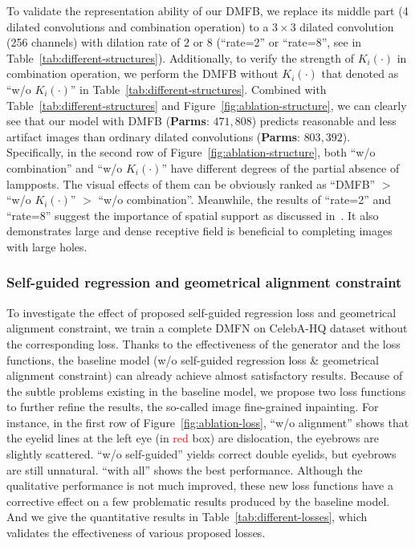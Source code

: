 \documentclass[journal]{IEEEtran}
\begin{document}
To validate the representation ability of our DMFB, we replace its middle part (4 dilated convolutions and combination operation) to a $3 \times 3$ dilated convolution (256 channels) with dilation rate of $2$ or $8$ (``rate=2'' or ``rate=8'', see in Table~\ref{tab:different-structures}). Additionally, to verify the strength of ${K_i}\left(  \cdot  \right)$ in combination operation, we perform the DMFB without ${K_i}\left(  \cdot  \right)$ that denoted as ``w/o ${K_i}\left(  \cdot  \right)$'' in Table~\ref{tab:different-structures}. Combined with Table~\ref{tab:different-structures} and Figure~\ref{fig:ablation-structure}, we can clearly see that our model with DMFB (\textbf{Parms}: $471,808$) predicts reasonable and less artifact images than ordinary dilated convolutions (\textbf{Parms}: $803,392$). Specifically, in the second row of Figure~\ref{fig:ablation-structure}, both ``w/o combination'' and ``w/o ${K_i}\left(  \cdot  \right)$'' have different degrees of the partial absence of lampposts. The visual effects of them can be obviously ranked as ``DMFB'' $>$ ``w/o ${K_i}\left(  \cdot  \right)$'' $>$ ``w/o combination''. Meanwhile, the results of ``rate=2'' and ``rate=8'' suggest the importance of spatial support as discussed in~\cite{globally-and-locally}. It also demonstrates large and dense receptive field is beneficial to completing images with large holes.

\subsubsection{Self-guided regression and geometrical alignment constraint}
To investigate the effect of proposed self-guided regression loss and geometrical alignment constraint, we train a complete DMFN on CelebA-HQ dataset without the corresponding loss. Thanks to the effectiveness of the generator and the loss functions, the baseline model (w/o self-guided regression loss \& geometrical alignment constraint) can already achieve almost satisfactory results. Because of the subtle problems existing in the baseline model, we propose two loss functions to further refine the results, the so-called image fine-grained inpainting. For instance, in the first row of Figure~\ref{fig:ablation-loss}, ``w/o alignment'' shows that the eyelid lines at the left eye (in \textcolor{red}{red} box) are dislocation, the eyebrows are slightly scattered. ``w/o self-guided'' yields correct double eyelids, but eyebrows are still unnatural. ``with all'' shows the best performance. Although the qualitative performance is not much improved, these new loss functions have a corrective effect on a few problematic results produced by the baseline model. And we give the quantitative results in Table~\ref{tab:different-losses}, which validates the effectiveness of various proposed losses.
\end{document}
